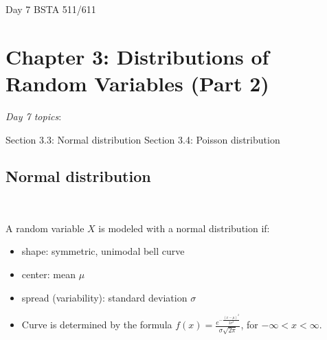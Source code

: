 \documentclass[12pt]{amsart}
\newtheorem{example}[theorem]{Example}
\newcommand{\m}{\mu}
\newcommand{\s}{\sigma}
\begin{document}
\setcounter{section}{3}
\setcounter{subsection}{2}
Day 7 BSTA 511/611
{\huge  
\section*{Chapter 3: Distributions of Random Variables (Part 2)}
}



{\large 

\emph{Day 7 topics}:

Section 3.3: Normal distribution  \newline
Section 3.4: Poisson distribution

\hrulefill

%
%
%
%
%
%






\vspace{.5cm}

\subsection{Normal distribution} $\ $ \newline

A random variable $X$ is modeled with a normal distribution if:
\begin{itemize}
\item shape: symmetric, unimodal bell curve
\item center: mean $\m$
\item spread (variability): standard deviation $\s$
\item Curve is determined by the formula $f(x) = \frac{e^{-\frac{(x-\m)^2}{2\s^2}}}{\s\sqrt{2\pi}}$, for $-\infty < x< \infty$.


\end{itemize}}
\end{document}

